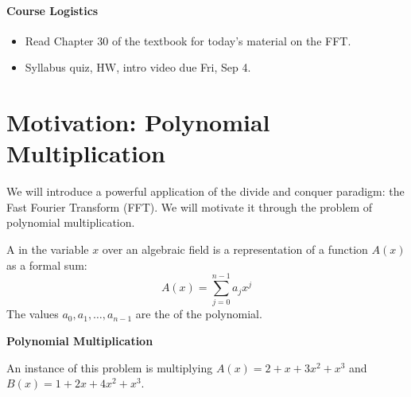 \documentclass[11  pt]{article}
\begin{document}
\onehalfspacing


\paragraph{Course Logistics}

\begin{itemize}
\item Read Chapter 30 of the textbook for today's material on the FFT.
\item Syllabus quiz, HW, intro video due Fri, Sep 4.
\end{itemize}

\section{Motivation: Polynomial Multiplication}

We will introduce a powerful application of the divide and conquer paradigm: the Fast Fourier Transform (FFT). We will motivate it through the problem of polynomial multiplication.

\begin{definition} \noindent A  in the variable $x$ over an algebraic field is a representation of a function $A(x)$ as a formal sum:
    \begin{equation*}
        A(x) = \sum_{j=0}^{n-1} a_j x^j
    \end{equation*}
    The values $a_0, a_1, \hdots, a_{n-1}$ are the  of the polynomial. 
\end{definition}

\vs{.5cm}

\begin{example}\textbf{Polynomial Multiplication} \\

\vs{5pt}

An instance of this problem is multiplying $A(x) = 2 + x + 3x^2 + x^3$ and $B(x) = 1 + 2x + 4x^2 + x^3$.
\end{example}
\end{document}
